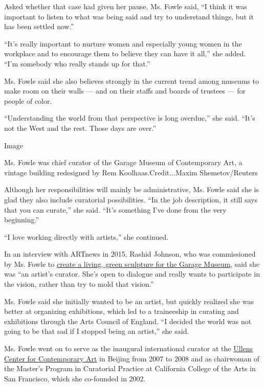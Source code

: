 Asked whether that case had given her pause, Ms. Fowle said, ``I think
it was important to listen to what was being said and try to understand
things, but it has been settled now.''

``It's really important to nurture women and especially young women in
the workplace and to encourage them to believe they can have it all,''
she added. ``I'm somebody who really stands up for that.''

Ms. Fowle said she also believes strongly in the current trend among
museums to make room on their walls --- and on their staffs and boards
of trustees --- for people of color.

``Understanding the world from that perspective is long overdue,'' she
said. ``It's not the West and the rest. Those days are over.''

Image

Ms. Fowle was chief curator of the Garage Museum of Contemporary Art, a
vintage building redesigned by Rem Koolhaas.Credit...Maxim
Shemetov/Reuters

Although her responsibilities will mainly be administrative, Ms. Fowle
said she is glad they also include curatorial possibilities. ``In the
job description, it still says that you can curate,'' she said. ``It's
something I've done from the very beginning.''

``I love working directly with artists,'' she continued.

In an interview with ARTnews in 2015, Rashid Johnson, who was
commissioned by Ms. Fowle to
\href{https://news.artnet.com/exhibitions/garage-museum-spring-exhibitions-454715}{create
a living, green sculpture for the Garage Museum}, said she was ``an
artist's curator. She's open to dialogue and really wants to participate
in the vision, rather than try to mold that vision.''

Ms. Fowle said she initially wanted to be an artist, but quickly
realized she was better at organizing exhibitions, which led to a
traineeship in curating and exhibitions through the Arts Council of
England. ``I decided the world was not going to be that sad if I stopped
being an artist,'' she said.

Ms. Fowle went on to serve as the inaugural international curator at the
\href{http://ucca.org.cn/en/}{Ullens Center for Contemporary Art} in
Beijing from 2007 to 2008 and as chairwoman of the Master's Program in
Curatorial Practice at California College of the Arts in San Francisco,
which she co-founded in 2002.

